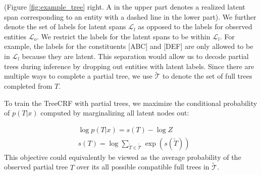 (Figure \ref{fig:example_tree} right. A \scalebox{0.8}{$\blacksquare$} in the upper part denotes a realized latent span corresponding to an entity with a dashed line in the lower part). 
We further denote the set of labels for latent spans $\mathcal{L}_{l}$ as opposed to the labels for observed entities $\mathcal{L}_{o}$. 
We restrict the labels for the latent spans to be within $\mathcal{L}_{l}$. 
For example, the labels for the constituents [ABC] and [DEF] are only allowed to be in $\mathcal{L}_{l}$ because they are latent. 
This separation would allow us to decode partial trees during inference by dropping out entities with latent labels. 
Since there are multiple ways to complete a partial tree, we use $\tilde{\mathcal{T}}$ to denote the set of full trees completed from $T$. 

To train the TreeCRF with partial trees, 
we maximize the conditional probability of $p(T| x)$ computed by marginalizing all latent nodes \scalebox{0.8}{$\square$} out:

\begin{align}
  &\log p(T | x) = s(T) - \log Z  \label{eq:log_prob} \\ 
  &s(T) = \log \sum_{\tilde{T} \in \tilde{\mathcal{T}}} \exp( s(\tilde{T})) \label{eq:summation}
\end{align}
This objective could equivalently be viewed as the average probability of the observed partial tree $T$ over its all possible compatible full trees in $\tilde{\mathcal{T}}$. 








